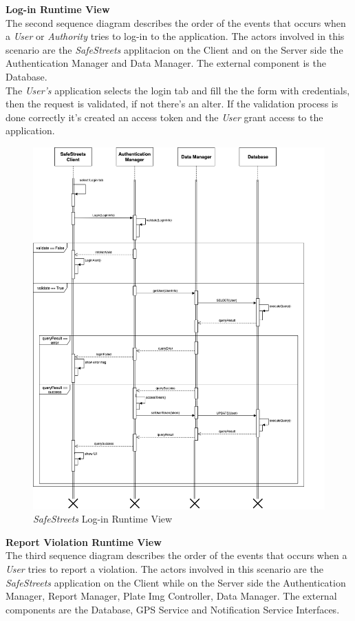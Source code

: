 \documentclass{article}
\begin{document}
	\pagebreak
	\noindent
	{\bf Log-in Runtime View} \\
	The second sequence diagram describes the order of the events that occurs when a {\it User} or {\it Authority} tries to log-in to the application. The actors involved in this scenario are the {\it SafeStreets} applitacion on the Client and on the Server side the Authentication Manager and Data Manager. The external component is the Database. \\ 
	The {\it User's} application selects the login tab and fill the the form with credentials, then the request is validated, if not there's an alter. If the validation process is done correctly it's created an access token and the {\it User} grant access to the application.
	\begin{figure}[H]
			\centering
			\includegraphics[scale=0.33]{Images/Diagrams/Runtime/login_runtime.png}
			\caption{{\it SafeStreets} Log-in Runtime View}
	\end{figure}
	\pagebreak
	\noindent	
	{\bf Report Violation Runtime View} \\
	The third sequence diagram describes the order of the events that occurs when a {\it User} tries to report a violation. The actors involved in this scenario are the {\it SafeStreets} application on the Client while on the Server side the Authentication Manager, Report Manager, Plate Img Controller, Data Manager. The external components are the Database, GPS Service and Notification Service Interfaces. \\ 
\end{document}
